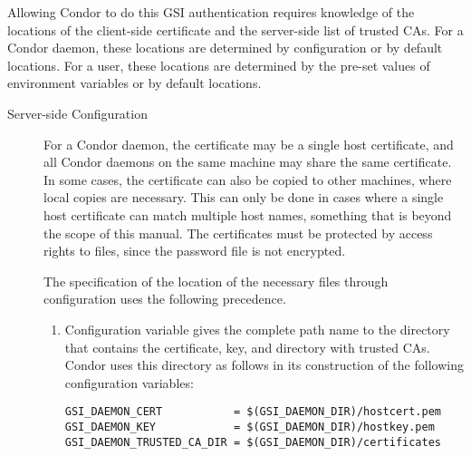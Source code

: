 Allowing Condor to do this GSI authentication
requires knowledge of the locations of
the client-side certificate and the server-side list of
trusted CAs.
For a Condor daemon, these locations are determined
by configuration or by default locations.
For a user, these locations are determined by the
pre-set values of environment variables or by default locations.

\begin{description}
\item[Server-side Configuration]

For a Condor daemon, the certificate may be a single host certificate,
and all Condor daemons on the same machine may share the same certificate.
In some cases, the certificate can also be copied to other machines,
where local copies are necessary.
This can only be done in cases where a single host certificate can
match multiple host names, something that is beyond the scope of this
manual. 
The certificates must be protected by access rights to files,
since the password file is not encrypted.


The specification of the location of the necessary files
through configuration uses the following precedence.
\begin{enumerate}
\item
Configuration variable  gives the complete
path name to the directory that contains the certificate, key,
and directory with trusted CAs.
Condor uses this directory as follows in its construction of the following
configuration variables:
\footnotesize
\begin{verbatim}
GSI_DAEMON_CERT           = $(GSI_DAEMON_DIR)/hostcert.pem
GSI_DAEMON_KEY            = $(GSI_DAEMON_DIR)/hostkey.pem 
GSI_DAEMON_TRUSTED_CA_DIR = $(GSI_DAEMON_DIR)/certificates 
\end{verbatim}


\end{enumerate}
\end{description}
